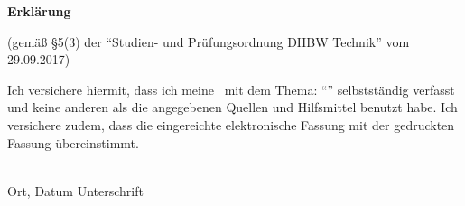 \cleardoublepage
\thispagestyle{empty}

\begin{framed}
	\begin{center}
		\textsf{\huge{\textbf{Erklärung}}}
	\end{center}
	\medskip
	\noindent	
	
	(gemäß §5(3) der \enquote{Studien- und Prüfungsordnung DHBW Technik} vom 29.09.2017)
	
	\smallskip
	
	Ich versichere hiermit, dass ich meine \typeofwork~mit dem Thema: \enquote{\titleofwork} selbstständig verfasst und keine anderen als die angegebenen Quellen und Hilfsmittel benutzt habe. Ich versichere zudem, dass die eingereichte elektronische Fassung mit der gedruckten Fassung übereinstimmt.		
	
	\vspace{1.5cm}
	\noindent
	\underline{\hspace{6cm}}
	\hfill
	\underline{\hspace{6cm}}\\Ort, Datum
	\hfill Unterschrift\hspace{4cm}
\end{framed}

\vfill

%	
